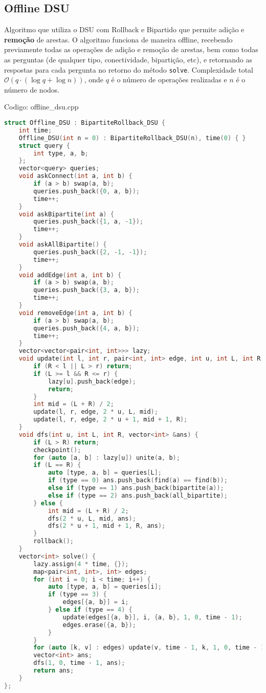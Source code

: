 \documentclass[10pt, a4paper, oneside]{book}
\begin{document}
\subsection{Offline DSU}


Algoritmo que utiliza o DSU com Rollback e Bipartido que permite adição e \textbf{remoção} de arestas. O algoritmo funciona de maneira offline, recebendo previamente todas as operações de adição e remoção de arestas, bem como todas as perguntas (de qualquer tipo, conectividade, bipartição, etc), e retornando as respostas para cada pergunta no retorno do método \texttt{solve}. Complexidade total $\mathcal{O}(q\cdot(\log q + \log n))$, onde $q$ é o número de operações realizadas e $n$ é o número de nodos.

\hfill

Codigo: offline\_dsu.cpp

\begin{lstlisting}[language=C++]
struct Offline_DSU : BipartiteRollback_DSU {
    int time;
    Offline_DSU(int n = 0) : BipartiteRollback_DSU(n), time(0) { }
    struct query {
        int type, a, b;
    };
    vector<query> queries;
    void askConnect(int a, int b) {
        if (a > b) swap(a, b);
        queries.push_back({0, a, b});
        time++;
    }
    void askBipartite(int a) {
        queries.push_back({1, a, -1});
        time++;
    }
    void askAllBipartite() {
        queries.push_back({2, -1, -1});
        time++;
    }
    void addEdge(int a, int b) {
        if (a > b) swap(a, b);
        queries.push_back({3, a, b});
        time++;
    }
    void removeEdge(int a, int b) {
        if (a > b) swap(a, b);
        queries.push_back({4, a, b});
        time++;
    }
    vector<vector<pair<int, int>>> lazy;
    void update(int l, int r, pair<int, int> edge, int u, int L, int R) {
        if (R < l || L > r) return;
        if (L >= l && R <= r) {
            lazy[u].push_back(edge);
            return;
        }
        int mid = (L + R) / 2;
        update(l, r, edge, 2 * u, L, mid);
        update(l, r, edge, 2 * u + 1, mid + 1, R);
    }
    void dfs(int u, int L, int R, vector<int> &ans) {
        if (L > R) return;
        checkpoint();
        for (auto [a, b] : lazy[u]) unite(a, b);
        if (L == R) {
            auto [type, a, b] = queries[L];
            if (type == 0) ans.push_back(find(a) == find(b));
            else if (type == 1) ans.push_back(bipartite(a));
            else if (type == 2) ans.push_back(all_bipartite);
        } else {
            int mid = (L + R) / 2;
            dfs(2 * u, L, mid, ans);
            dfs(2 * u + 1, mid + 1, R, ans);
        }
        rollback();
    }
    vector<int> solve() {
        lazy.assign(4 * time, {});
        map<pair<int, int>, int> edges;
        for (int i = 0; i < time; i++) {
            auto [type, a, b] = queries[i];
            if (type == 3) {
                edges[{a, b}] = i;
            } else if (type == 4) {
                update(edges[{a, b}], i, {a, b}, 1, 0, time - 1);
                edges.erase({a, b});
            }
        }
        for (auto [k, v] : edges) update(v, time - 1, k, 1, 0, time - 1);
        vector<int> ans;
        dfs(1, 0, time - 1, ans);
        return ans;
    }
};\end{lstlisting}
\hfill
\end{document}

